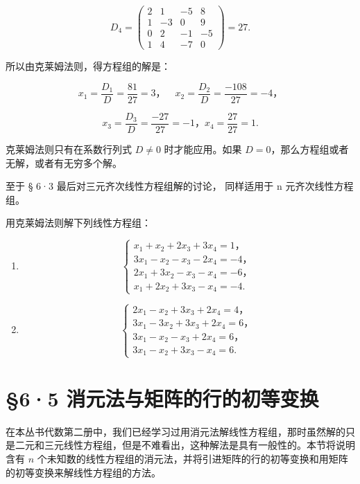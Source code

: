 \[
D _ {4} = \left( \begin{array}{cccc} 2 & 1 & - 5 & 8 \\ 1 & - 3 & 0 & 9 \\ 0 & 2 & - 1 & - 5 \\ 1 & 4 & - 7 & 0 \end{array} \right) = 27.
\]

所以由克莱姆法则，得方程组的解是：

\[
x _ {1} = \frac {D _ {1}}{D} = \frac {81}{27} = 3\text{，} \quad x _ {2} = \frac {D _ {2}}{D} = \frac {- 108}{27} = - 4\text{，}
\]

\[
x _ {3} = \frac {D _ {3}}{D} = \frac {- 27}{27} = - 1\text{，} x _ {4} = \frac {27}{27} = 1.
\]

 克莱姆法则只有在系数行列式 \(D \neq 0\)
时才能应用。如果 \(D = 0\)，那么方程组或者无解，或者有无穷多个解。

至于 § 6·3 最后对三元齐次线性方程组解的讨论， 同样适用于 n
元齐次线性方程组。

用克莱姆法则解下列线性方程组：


\begin{enumerate}[start=1]
\item
\[
\left\{ \begin{array}{l} x _ {1} + x _ {2} + 2 x _ {3} + 3 x _ {4} = 1\text{，} \\ 3 x _ {1} - x _ {2} - x _ {3} - 2 x _ {4} = - 4\text{，} \\ 2 x _ {1} + 3 x _ {2} - x _ {3} - x _ {4} = - 6\text{，} \\ x _ {1} + 2 x _ {2} + 3 x _ {3} - x _ {4} = - 4. \end{array} \right.
\]
\item
\[
\left\{ \begin{array}{l} 2 x _ {1} - x _ {2} + 3 x _ {3} + 2 x _ {4} = 4\text{，} \\ 3 x _ {1} - 3 x _ {2} + 3 x _ {3} + 2 x _ {4} = 6\text{，} \\ 3 x _ {1} - x _ {2} - x _ {3} + 2 x _ {4} = 6\text{，} \\ 3 x _ {1} - x _ {2} + 3 x _ {3} - x _ {4} = 6. \end{array} \right.
\]
\end{enumerate}
\section{§6·5 消元法与矩阵的行的初等变换}

在本丛书代数第二册中，我们已经学习过用消元法解线性方程组，那时虽然解的只是二元和三元线性方程组，但是不难看出，这种解法是具有一般性的。本节将说明含有
\(n\)
个未知数的线性方程组的消元法，并将引进矩阵的行的初等变换和用矩阵的初等变换来解线性方程组的方法。

